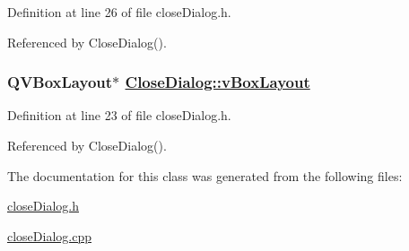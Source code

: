 Definition at line 26 of file close\-Dialog.h.

Referenced by Close\-Dialog().\hypertarget{classCloseDialog_r0}{
\subsubsection[vBoxLayout]{\setlength{\rightskip}{0pt plus 5cm}QVBox\-Layout$\ast$ \hyperlink{classCloseDialog_r0}{Close\-Dialog::v\-Box\-Layout}}}
\label{classCloseDialog_r0}


Definition at line 23 of file close\-Dialog.h.

Referenced by Close\-Dialog().

The documentation for this class was generated from the following files:\begin{CompactItemize}
\item 
\hyperlink{closeDialog_8h}{close\-Dialog.h}\item 
\hyperlink{closeDialog_8cpp}{close\-Dialog.cpp}\end{CompactItemize}
